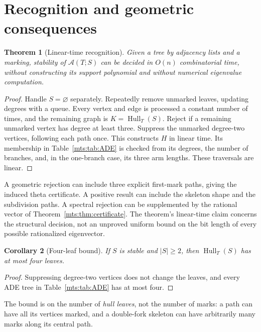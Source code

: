 \documentclass[11pt]{article}
\numberwithin{equation}{section}
\newtheorem{theorem}{Theorem}[section]
\newtheorem{corollary}[theorem]{Corollary}
\theoremstyle{definition}
\newcommand{\calA}{\mathcal A}
\newcommand{\Hull}{\operatorname{Hull}}
\begin{document}
\section{Recognition and geometric consequences}\label{mts:sec:recognition}

\begin{theorem}[Linear-time recognition]\label{mts:thm:recognition}
Given a tree by adjacency lists and a marking, stability of $\calA(T;S)$ can
be decided in $O(n)$ combinatorial time, without constructing its support
polynomial and without numerical eigenvalue computation.
\end{theorem}
\begin{proof}
Handle $S=\varnothing$ separately. Repeatedly remove unmarked leaves,
updating degrees with a queue. Every vertex and edge is processed a
constant number of times, and the remaining graph is $K=\Hull_T(S)$.
Reject if a remaining unmarked vertex has degree at least three.
Suppress the unmarked degree-two vertices, following each path once.
This constructs $H$ in linear time. Its membership in Table~\ref{mts:tab:ADE} is
checked from its degrees, the number of branches, and, in the one-branch
case, its three arm lengths. These traversals are linear.
\end{proof}

A geometric rejection can include three explicit first-mark paths, giving
the induced theta certificate. A positive result can include the skeleton
shape and the subdivision paths. A spectral rejection can be supplemented
by the rational vector of Theorem~\ref{mts:thm:certificate}. The theorem's linear-time
claim concerns the structural decision, not an unproved uniform bound on
the bit length of every possible rationalized eigenvector.

\begin{corollary}[Four-leaf bound]\label{mts:cor:leaves}
If $S$ is stable and $|S|\ge2$, then $\Hull_T(S)$ has at most four leaves.
\end{corollary}
\begin{proof}
Suppressing degree-two vertices does not change the leaves, and every
ADE tree in Table~\ref{mts:tab:ADE} has at most four.
\end{proof}

The bound is on the number of \emph{hull leaves}, not the number of marks:
a path can have all its vertices marked, and a double-fork skeleton can
have arbitrarily many marks along its central path.
\end{document}
